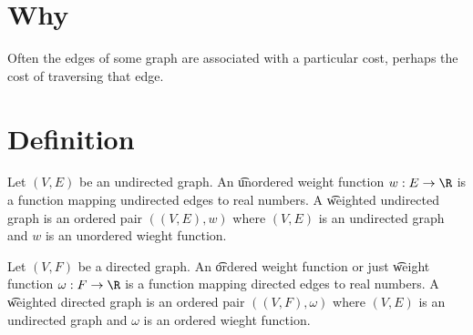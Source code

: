 

\section*{Why}

Often the edges of some graph are associated with a particular cost, perhaps the cost of traversing that edge.

\section*{Definition}

Let $(V, E)$ be an undirected graph.
An \t{unordered weight function} $w: E \to \R $ is a function mapping undirected edges to real numbers.
A \t{weighted undirected graph} is an ordered pair $((V, E),w)$ where $(V, E)$ is an undirected graph and $w$ is an unordered wieght function.

Let $(V, F)$ be a directed graph.
An \t{ordered weight function} or just \t{weight function} $\omega : F \to \R $ is a function mapping directed edges to real numbers.
A \t{weighted directed graph} is an ordered pair $((V, F),\omega )$ where $(V, E)$ is an undirected graph and $\omega $ is an ordered wieght function.

\blankpage